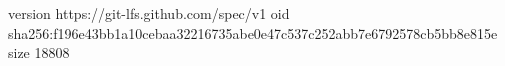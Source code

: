 version https://git-lfs.github.com/spec/v1
oid sha256:f196e43bb1a10cebaa32216735abe0e47c537c252abb7e6792578cb5bb8e815e
size 18808
